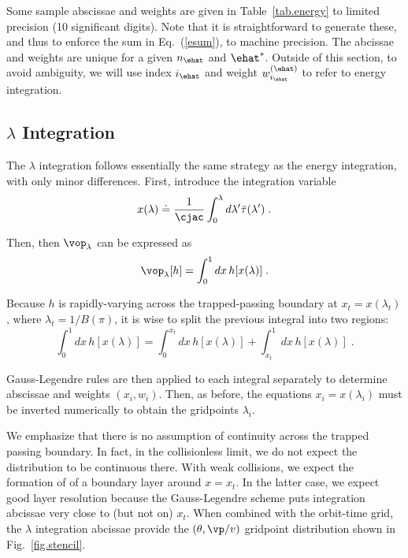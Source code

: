 Some sample abscissae and weights are given in Table~\ref{tab.energy} 
to limited precision (10 significant digits). Note that it is  
straightforward to generate these, and thus to enforce the 
sum in Eq.~(\ref{esum}), to machine precision.  The abcissae 
and weights are unique for a given $n_\ehat$ and $\ehat^*$.  
Outside of this section, to avoid ambiguity, we will use 
index $i_\ehat$ and weight $w^{(\ehat)}_{i_\ehat}$ to refer to 
energy integration.

\subsection{$\lambda$ Integration}

The $\lambda$ integration follows essentially the  
same strategy as the energy integration, with only 
minor differences.  First, introduce the integration 
variable
%
\begin{equation}
x(\lambda) \doteq \frac{1}{\cjac} \int_0^\lambda 
d\lambda^\prime \bar{\tau}(\lambda^\prime)\; .
\end{equation}

\noindent
Then, then $\vop_\lambda$ can be expressed as
%
\begin{equation}
\vop_\lambda[h] = \int_0^1 dx \,h[x(\lambda)] \; .
\end{equation}

\noindent
Because $h$ is rapidly-varying across the trapped-passing 
boundary at $x_t = x(\lambda_t)$, where $\lambda_t = 1/B(\pi)$, 
it is wise to split the previous integral into two regions:
%
\begin{equation}
\int_0^1 dx \, h[x(\lambda)] = \int_0^{x_t} dx \, h[x(\lambda)]
+ \int_{x_t}^1 dx \, h[x(\lambda)] \; .
\end{equation}

\noindent
Gauss-Legendre rules are then applied to each integral 
separately to determine abscissae and weights $(x_i,w_i)$.  
Then, as before, the equations $x_i = x(\lambda_i)$ must 
be inverted numerically to obtain the gridpoints $\lambda_i$.  

We emphasize that there is no assumption of continuity across 
the trapped passing boundary.  In fact, in the collisionless 
limit, we do not expect the distribution to be continuous 
there.  With weak collisions, we expect the formation of 
of a boundary layer around $x=x_t$.  In the latter case, 
we expect good layer resolution because the Gauss-Legendre 
scheme puts integration abcissae very close to (but not 
on) $x_t$.  When combined with the orbit-time grid, the 
$\lambda$ integration abcissae provide the $(\theta,\vp/v)$ 
gridpoint distribution shown in Fig.~\ref{fig.stencil}.

